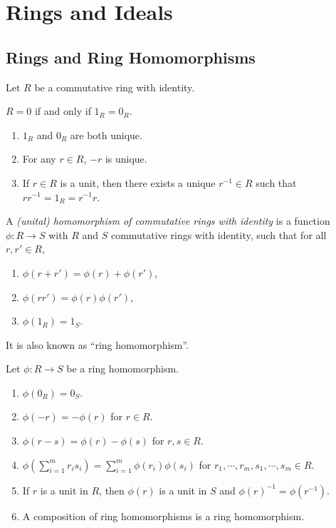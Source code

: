\chapter{Rings and Ideals}

\section*{Rings and Ring Homomorphisms}

Let $R$ be a commutative ring with identity.

\begin{fact}
    $R = 0$ if and only if $1_R = 0_R$.
\end{fact}

\begin{fact}
    \begin{enumerate}
        \item $1_R$ and $0_R$ are both unique.
        \item For any $r \in R$, $-r$ is unique.
        \item If $r \in R$ is a unit, then there exists a unique $r^{-1} \in R$ such that $rr^{-1} = 1_R = r^{-1}r$.
    \end{enumerate}
\end{fact}

\begin{definition}
    A \emph{(unital) homomorphism of commutative rings with identity} is a function $\phi: R \to S$ with $R$ and $S$ commutative rings with identity, such that for all $r,r' \in R$,
    \begin{enumerate}
        \item $\phi(r+r') = \phi(r) + \phi(r')$,
        \item $\phi(rr') = \phi(r) \phi(r')$,
        \item $\phi(1_R) = 1_S$.
    \end{enumerate}
    It is also known as ``ring homomorphism''.
\end{definition}

\begin{fact}
    Let $\phi: R \to S$ be a ring homomorphism.
    \begin{enumerate}
        \item $\phi(0_R) = 0_S$.
        \item $\phi(-r) = -\phi(r)$ for $r \in R$.
        \item $\phi(r-s) = \phi(r) - \phi(s)$ for $r,s \in R$.
        \item $\phi(\sum_{i=1}^mr_is_i) = \sum_{i=1}^m\phi(r_i)\phi(s_i)$ for $r_1,\cdots,r_m,s_1,\cdots,s_m \in R$.
        \item If $r$ is a unit in $R$, then $\phi(r)$ is a unit in $S$ and $\phi(r)^{-1} = \phi(r^{-1})$.
        \item A composition of ring homomorphisms is a ring homomorphism.
    \end{enumerate}
\end{fact}

